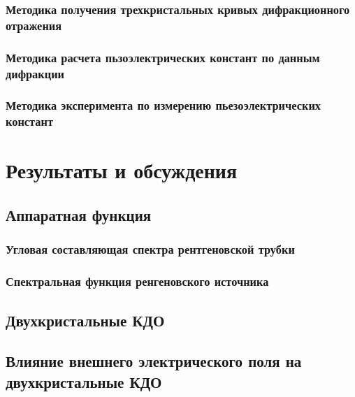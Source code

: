 \documentclass[pdftex,a4paper,14pt,english,russian]{extarticle}
\numberwithin{equation}{subsection}
\newcounter{subsubsubsection}[subsubsection]
\begin{document}
    \subsubsection{Методика получения трехкристальных кривых дифракционного отражения}
        
        
    \subsubsection{Методика расчета пьзоэлектрических констант по данным дифракции}
      
      \subsubsection{Методика эксперимента по измерению пьезоэлектрических констант}
            
            


\newpage
\section{Результаты и обсуждения}
  \subsection{Аппаратная функция}
  \subsubsection{Угловая составляющая спектра рентгеновской трубки}
    
  \subsubsection{Спектральная функция ренгеновского источника}
      
  \subsection{Двухкристальные КДО}
    
    
    
  \subsection{Влияние внешнего электрического поля на двухкристальные КДО}
    
\end{document}
